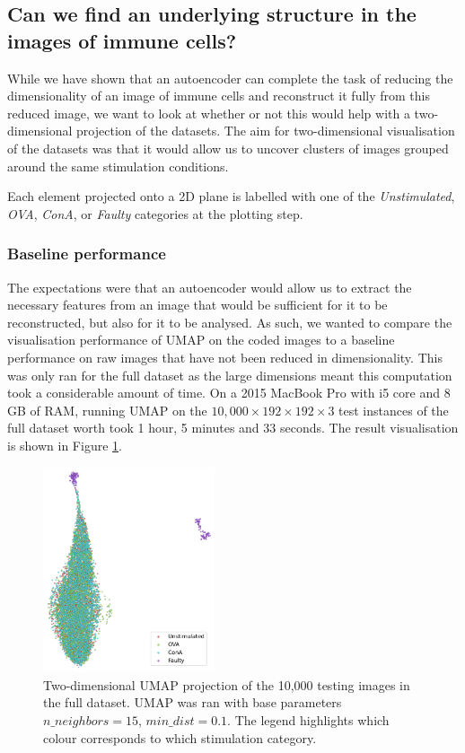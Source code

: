 \subsection{Can we find an underlying structure in the images of immune cells?}

While we have shown that an autoencoder can complete the task of reducing the dimensionality of an image of immune cells and reconstruct it fully from this reduced image, we want to look at whether or not this would help with a two-dimensional projection of the datasets. The aim for two-dimensional visualisation of the datasets was that it would allow us to uncover clusters of images grouped around the same stimulation conditions.

Each element projected onto a 2D plane is labelled with one of the \textit{Unstimulated}, \textit{OVA}, \textit{ConA}, or \textit{Faulty} categories at the plotting step.

\bigskip
\subsubsection{Baseline performance}
\hfill
\hfill 

The expectations were that an autoencoder would allow us to extract the necessary features from an image that would be sufficient for it to be reconstructed, but also for it to be analysed. As such, we wanted to compare the visualisation performance of UMAP on the coded images to a baseline performance on raw images that have not been reduced in dimensionality. This was only ran for the full dataset as the large dimensions meant this computation took a considerable amount of time. On a 2015 MacBook Pro with i5 core and 8 GB of RAM, running UMAP on the $10,000\times192\times192\times3$ test instances of the full dataset worth took 1 hour, 5 minutes and 33 seconds. The result visualisation is shown in Figure \ref{fig:baseline_vis}.


\begin{figure}[h!]
    \centering
    \includegraphics[width=0.45\textwidth]{dissertation/figures/evaluation/CK19_baseline_visualisation.png}
    \caption{Two-dimensional UMAP projection of the 10,000 testing images in the full dataset. UMAP was ran with base parameters $n\_neighbors=15$, $min\_dist=0.1$. The legend highlights which colour corresponds to which stimulation category.}
    \label{fig:baseline_vis}
\end{figure}

